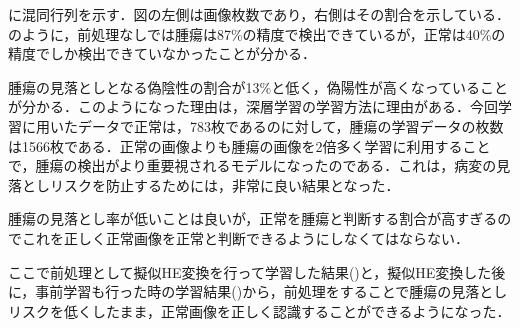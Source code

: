 に混同行列を示す．図の左側は画像枚数であり，右側はその割合を示している．
のように，前処理なしでは腫瘍は87\%の精度で検出できているが，正常は40\%の精度でしか検出できていなかったことが分かる．

腫瘍の見落としとなる偽陰性の割合が13\%と低く，偽陽性が高くなっていることが分かる．このようになった理由は，深層学習の学習方法に理由がある．今回学習に用いたデータで正常は，783枚であるのに対して，腫瘍の学習データの枚数は1566枚である．正常の画像よりも腫瘍の画像を2倍多く学習に利用することで，腫瘍の検出がより重要視されるモデルになったのである．これは，病変の見落としリスクを防止するためには，非常に良い結果となった．

腫瘍の見落とし率が低いことは良いが，正常を腫瘍と判断する割合が高すぎるのでこれを正しく正常画像を正常と判断できるようにしなくてはならない．

ここで前処理として擬似HE変換を行って学習した結果()と，擬似HE変換した後に，事前学習も行った時の学習結果()から，前処理をすることで腫瘍の見落としリスクを低くしたまま，正常画像を正しく認識することができるようになった．

